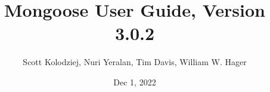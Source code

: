 \title{Mongoose User Guide, Version 3.0.2}
\author{Scott Kolodziej, Nuri Yeralan, Tim Davis, William W. Hager}
\date{Dec 1, 2022}
